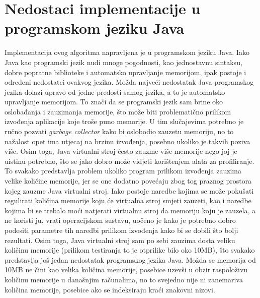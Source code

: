 \section{Nedostaci implementacije u programskom jeziku Java}
Implementacija ovog algoritma napravljena je u programskom jeziku Java.  Iako Java kao programski jezik nudi mnoge pogodnosti, kao jednostavnu sintaksu, dobre popratne biblioteke i automatsko upravljanje memorijom, ipak postoje i određeni nedostatci ovakvog jezika. Možda najveći nedostatak Java programskog jezika dolazi upravo od jedne predosti samog jezika, a to je automatsko upravljanje memorijom. To znači da se programski jezik sam brine oko oslobađanja i zauzimanja memorije, što može biti problematično prilikom izvođenja aplikacije koje troše puno memorije. U tim slučajevima potrebno je ručno pozvati \textit{garbage collector} kako bi oslobodio zauzetu memoriju, no to nažalost opet ima utjecaj na brzinu izvođenja, posebno ukoliko je takvih poziva više. Osim toga, Java virtualni stroj često zauzme više memorije nego joj je uistinu potrebno, što se jako dobro može vidjeti korištenjem alata za profiliranje. To svakako predstavlja problem ukoliko program prilikom izvođenja zauzima velike količine memorije, jer se one dodatno povećaju zbog tog praznog prostora kojeg zauzme Java virtualni stroj. Iako postoje naredbe kojima se može pokušati regulirati količina memorije koju će virtualna stroj smjeti zauzeti, kao i naredbe kojima bi se trebalo moći natjerati virtualnu stroj da memoriju koju je zauzela, a ne koristi ju, vrati operacijskom sustavu, uočeno je kako je potrebno dobro podesiti parametre tih naredbi prilikom izvođenja kako bi se dobili što bolji rezultati. Osim toga, Java virtualni stroj sam po sebi zauzima dosta veliku količinu memorije (prilikom testiranja to je otprilike bilo oko 10MB), što svakako predstavlja još jedan nedostatak programskog jezika Java. Možda se memorija od 10MB ne čini kao velika količina memorije, posebice uzevši u obzir raspoloživu količinu memorije u današnjim računalima, no to svejedno nije ni zanemariva količina memorije, posebice ako se indeksiraju kraći znakovni nizovi.

